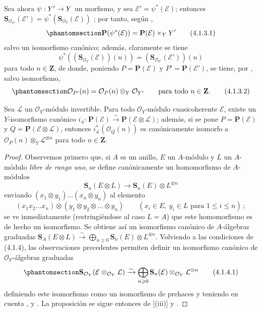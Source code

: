 \documentclass[oneside,10pt]{amsart}
\makeatletter
\renewcommand{\leq}{\leqslant}
\renewcommand{\geq}{\geqslant}
\newcommand{\ega@arrow}[2]{\mathchoice{#1}{#2}{#2}{#2}}
\renewcommand{\to}{\ega@arrow{\longrightarrow}{\rightarrow}}
\newcommand{\oldpage}[2][]{\marginnote{\normalfont\footnotesize\textbf{#1}~|~#2}\ignorespaces}
\let\EGAOriginalLabel\label
\renewcommand{\label}[1]{\phantomsection\EGAOriginalLabel{#1}}
\makeatother
\begin{document}
\begin{env}[4.1.3]
\label{II.4.1.3-fr}
Sea ahora $\psi:Y'\to Y$ un morfismo, y sea $\mathcal{E}'=\psi^*(\mathcal{E})$;
entonces $\mathbf{S}_{\mathcal{O}_{Y'}}(\mathcal{E}')=
\psi^*(\mathbf{S}_{\mathcal{O}_Y}(\mathcal{E}))$ ;
por tanto, según ,
\[
\label{II.4.1.3.1-fr}
  \mathbf{P}(\psi^*(\mathcal{E}))=
  \mathbf{P}(\mathcal{E})\times_YY'
\tag{4.1.3.1}
\]
salvo un isomorfismo canónico;
además, claramente se tiene
\[
  \psi^*((\mathbf{S}_{\mathcal{O}_Y}(\mathcal{E}))(n))
  =(\mathbf{S}_{\mathcal{O}_{Y'}}(\mathcal{E}'))(n)
\]
para todo $n\in\mathbf{Z}$, de donde, poniendo $P=\mathbf{P}(\mathcal{E})$ y $P'=\mathbf{P}(\mathcal{E}')$, se tiene, por , salvo isomorfismo,
\[
\label{II.4.1.3.2-fr}
  \mathcal{O}_{P'}(n)=\mathcal{O}_P(n)\otimes_Y\mathcal{O}_{Y'}
  \qquad\text{para todo }n\in\mathbf{Z}.
\tag{4.1.3.2}
\]
\end{env}

\oldpage[II]{72}
\begin{proposition}[4.1.4]
\label{II.4.1.4-fr}
Sea $\mathcal{L}$ un $\mathcal{O}_Y$-módulo invertible.
Para todo $\mathcal{O}_Y$-módulo cuasicoherente $\mathcal{E}$, existe un $Y$-isomorfismo canónico $i_{\mathcal{L}}:\mathbf{P}(\mathcal{E})\xrightarrow{\sim}
\mathbf{P}(\mathcal{E}\otimes\mathcal{L})$;
además, si se pone $P=\mathbf{P}(\mathcal{E})$ y $Q=\mathbf{P}(\mathcal{E}\otimes\mathcal{L})$, entonces $i_{\mathcal{L}}^*(\mathcal{O}_Q(n))$ es canónicamente isomorfo a $\mathcal{O}_P(n)\otimes_Y\mathcal{L}^{\otimes n}$ para todo $n\in\mathbf{Z}$.
\end{proposition}

\begin{proof}
Observemos primero que, si $A$ es un anillo, $E$ un $A$-módulo y $L$ un $A$-módulo \emph{libre de rango uno}, se define canónicamente un homomorfismo de $A$-módulos
\[
  \mathbf{S}_n(E\otimes L)\longrightarrow
  \mathbf{S}_n(E)\otimes L^{\otimes n}
\]
enviando $(x_1\otimes y_1)\ldots(x_n\otimes y_n)$ al elemento
\[
  (x_1x_2\ldots x_n)\otimes(y_1\otimes y_2\otimes\ldots\otimes y_n)
  \qquad(x_i\in E,\ y_i\in L\text{ para }1\leq i\leq n)~;
\]
se ve inmediatamente (restringiéndose al caso $L=A$) que este homomorfismo es de hecho un isomorfismo.
Se obtiene así un isomorfismo canónico de $A$-álgebras graduadas $\mathbf{S}_A(E\otimes L)\xrightarrow{\sim}
\bigoplus_{n\geq0}\mathbf{S}_n(E)\otimes L^{\otimes n}$.
Volviendo a las condiciones de (4.1.4), las observaciones precedentes permiten definir un isomorfismo canónico de $\mathcal{O}_Y$-álgebras graduadas
\[
\label{II.4.1.4.1-fr}
  \mathbf{S}_{\mathcal{O}_Y}(\mathcal{E}\otimes_{\mathcal{O}_Y}\mathcal{L})
  \xrightarrow{\sim}
  \bigoplus_{n\geq0}\mathbf{S}_n(\mathcal{E})
  \otimes_{\mathcal{O}_Y}\mathcal{L}^{\otimes n}
\tag{4.1.4.1}
\]
definiendo este isomorfismo como un isomorfismo de prehaces y teniendo en cuenta ,  y .
La proposición se sigue entonces de [(iii)] y .
\end{proof}
\end{document}

